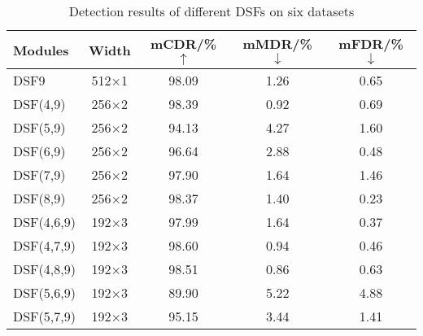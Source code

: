 \begin{table}[!t]
\renewcommand{\arraystretch}{1}
\centering
\caption{Detection results on MS COCO dataset}
\label{coco2015}
\end{table}

\begin{table}[!t]
	\renewcommand{\arraystretch}{1}
	\centering
	\caption{Detection results of different DSFs on six datasets}
	\begin{tabular}{lcccc}
		\toprule
		Modules  & Width & mCDR/\%$\uparrow$      & mMDR/\%$\downarrow$     & mFDR/\%$\downarrow$ \\
		\midrule
		DSF9      &512$\times$1   & 98.09  & 1.26   & 0.65  \\
		DSF(4,9)    &256$\times$2   & 98.39  & 0.92   & 0.69  \\
		DSF(5,9)    &256$\times$2   & 94.13  & 4.27   & 1.60  \\
		DSF(6,9)    &256$\times$2   & 96.64  & 2.88   & 0.48  \\
		DSF(7,9)    &256$\times$2   & 97.90  & 1.64   & 1.46  \\
		DSF(8,9)    &256$\times$2   & 98.37  & 1.40   & 0.23  \\
		DSF(4,6,9)  &192$\times$3   & 97.99  & 1.64   & 0.37  \\
		DSF(4,7,9)  &192$\times$3   & 98.60  & 0.94   & 0.46  \\
		DSF(4,8,9)  &192$\times$3   & 98.51  & 0.86   & 0.63  \\
		DSF(5,6,9)  &192$\times$3   & 89.90  & 5.22   & 4.88  \\
		DSF(5,7,9)  &192$\times$3   & 95.15  & 3.44   & 1.41  \\
		\bottomrule
	\end{tabular}
	\label{diffmod}
\end{table}

